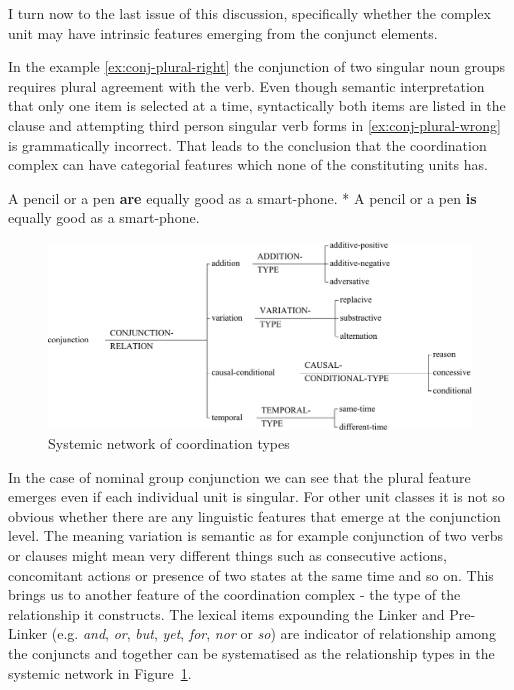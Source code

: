 I turn now to the last issue of this discussion, specifically whether the complex unit may have intrinsic features emerging from the conjunct elements. 

In the example \ref{ex:conj-plural-right} the conjunction of two singular noun groups requires plural agreement with the verb. Even though semantic interpretation that only one item is selected at a time, syntactically both items are listed in the clause and attempting third person singular verb forms in \ref{ex:conj-plural-wrong} is grammatically incorrect. That leads to the conclusion that the coordination complex can have categorial features which none of the constituting units has. 

\begin{exe}
	\ex\label{ex:conj-plural-right}
	A pencil or a pen \textbf{are} equally good as a smart-phone.
	\ex\label{ex:conj-plural-wrong} * A pencil or a pen \textbf{is} equally good as a smart-phone.
\end{exe}

\begin{figure}[!h]
	\centering
	\includegraphics[width=\textwidth]{Figures/SFL-grammar/conjunction-system.pdf}
	\caption{Systemic network of coordination types}
	\label{fig:conj-rel-types}
\end{figure}

In the case of nominal group conjunction we can see that the plural feature emerges even if each individual unit is singular. For other unit classes it is not so obvious whether there are any linguistic features that emerge at the conjunction level. The meaning variation is semantic as for example conjunction of two verbs or clauses might mean very different things such as consecutive actions, concomitant actions or presence of two states at the same time and so on. This brings us to another feature of the coordination complex - the type of the relationship it constructs. The lexical items expounding the Linker and Pre-Linker (e.g. \textit{and}, \textit{or}, \textit{but}, \textit{yet}, \textit{for}, \textit{nor} or \textit{so}) are indicator of relationship among the conjuncts and together can be systematised as the relationship types in the systemic network in \mbox{Figure \ref{fig:conj-rel-types}}.

